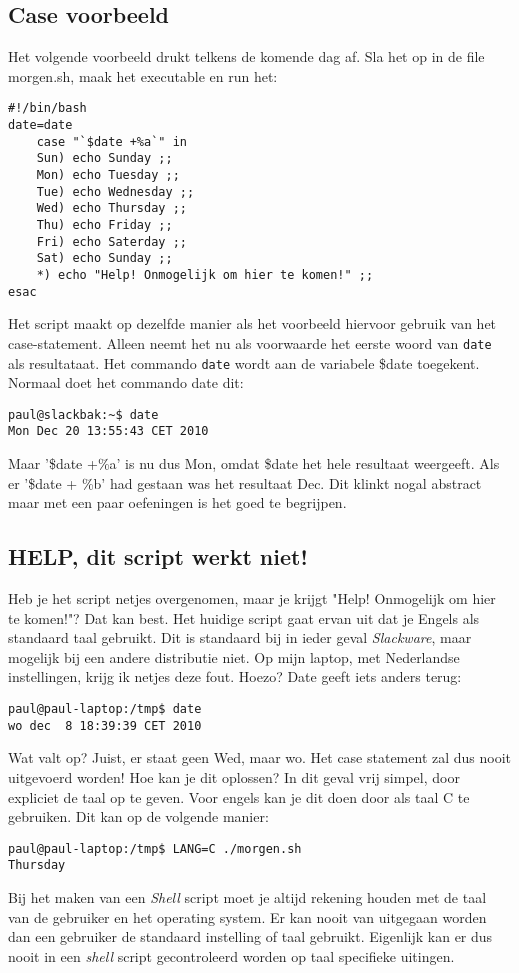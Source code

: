 \subsection{Case voorbeeld}
Het volgende voorbeeld drukt telkens de komende dag af. Sla het op in de file morgen.sh, maak het executable en run het:
\begin{lstlisting}
#!/bin/bash
date=date
	case "`$date +%a`" in
	Sun) echo Sunday ;;
	Mon) echo Tuesday ;;
	Tue) echo Wednesday ;;
	Wed) echo Thursday ;;
	Thu) echo Friday ;;
	Fri) echo Saterday ;;
	Sat) echo Sunday ;;
	*) echo "Help! Onmogelijk om hier te komen!" ;;
esac
\end{lstlisting}%
Het script maakt op dezelfde manier als het voorbeeld hiervoor gebruik van het case-statement. Alleen neemt het nu als voorwaarde het eerste woord van \texttt{date} als resultataat. Het commando \texttt{date} wordt aan de variabele \$date toegekent. Normaal doet het commando date dit: 
\begin{lstlisting}
paul@slackbak:~$ date
Mon Dec 20 13:55:43 CET 2010
\end{lstlisting}%
Maar '\$date +\%a' is nu dus Mon, omdat \$date het hele resultaat weergeeft. Als er '\$date + \%b' had gestaan was het resultaat Dec. Dit klinkt nogal abstract maar met een paar oefeningen is het goed te begrijpen.

\subsection{HELP, dit script werkt niet!}
Heb je het script netjes overgenomen, maar je krijgt "Help! Onmogelijk om hier te komen!"? Dat kan best. Het huidige script gaat ervan uit dat je Engels als standaard taal gebruikt. Dit is standaard bij in ieder geval \emph{Slackware}, maar mogelijk bij een andere distributie niet. Op mijn laptop, met Nederlandse instellingen, krijg ik netjes deze fout. Hoezo? Date geeft iets anders terug:
\begin{lstlisting}
paul@paul-laptop:/tmp$ date
wo dec  8 18:39:39 CET 2010
\end{lstlisting}%
Wat valt op? Juist, er staat geen Wed, maar wo. Het case statement zal dus nooit uitgevoerd worden! Hoe kan je dit oplossen? In dit geval vrij simpel, door expliciet de taal op te geven. Voor engels kan je dit doen door als taal C te gebruiken. Dit kan op de volgende manier:
\begin{lstlisting}
paul@paul-laptop:/tmp$ LANG=C ./morgen.sh 
Thursday
\end{lstlisting}%
Bij het maken van een \emph{Shell} script moet je altijd rekening houden met de taal van de gebruiker en het operating system. Er kan nooit van uitgegaan worden dan een gebruiker de standaard instelling of taal gebruikt. Eigenlijk kan er dus nooit in een \emph{shell} script gecontroleerd worden op taal specifieke uitingen.

